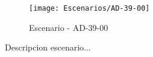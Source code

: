 \begin{figure}[H]
\centering
\texttt{[image: Escenarios/AD-39-00]}
\caption{Escenario - AD-39-00}
\label{fig:AD-39-00}
\end{figure}

Descripcion escenario...
\clearpage
